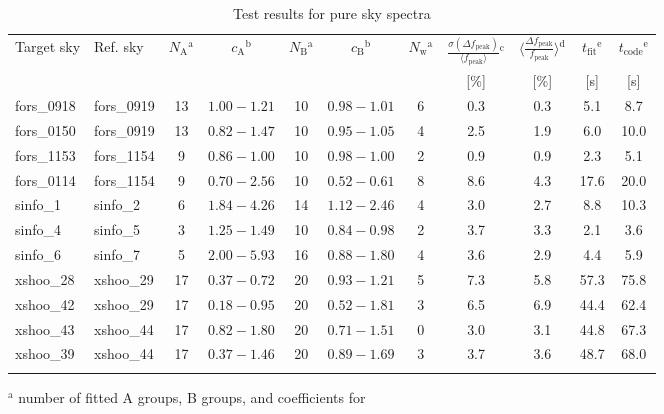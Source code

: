 \begin{table}
\caption[]{Test results for pure sky spectra}
\label{tab:results_sky}
\centering
\vspace{5pt}
\footnotesize
\begin{tabular}{l l c c c c c c c c c}
\hline\hline
\noalign{\smallskip}
Target sky & Ref. sky & $N_\mathrm{A}$$^\mathrm{a}$ & $c_\mathrm{A}$$^\mathrm{b}$ &
$N_\mathrm{B}$$^\mathrm{a}$ & $c_\mathrm{B}$$^\mathrm{b}$ & $N_\mathrm{w}$$^\mathrm{a}$ &
$\frac{\sigma(\Delta f_\mathrm{peak})}
{\langle f_\mathrm{peak} \rangle}$$^\mathrm{c}$ &
$\langle \frac{\Delta f_\mathrm{peak}}{f_\mathrm{peak}} \rangle$$^\mathrm{d}$ &
$t_\mathrm{fit}$$^\mathrm{e}$ & $t_\mathrm{code}$$^\mathrm{e}$ \\
& & & & & & & [\%] & [\%] & [s] & [s] \\
\noalign{\smallskip}
\hline
\noalign{\smallskip}
fors\_0918 & fors\_0919 & 13 & $1.00-1.21$ & 10 & $0.98-1.01$ & 6 &
0.3 & 0.3 & 5.1 & 8.7 \\
fors\_0150 & fors\_0919 & 13 & $0.82-1.47$ & 10 & $0.95-1.05$ & 4 &
2.5 & 1.9 & 6.0 & 10.0 \\
fors\_1153 & fors\_1154 & 9 & $0.86-1.00$ & 10 & $0.98-1.00$ & 2 &
0.9 & 0.9 & 2.3 & 5.1 \\
fors\_0114 & fors\_1154 & 9 & $0.70-2.56$ & 10 & $0.52-0.61$ & 8 &
8.6 & 4.3 & 17.6 & 20.0 \\
sinfo\_1 & sinfo\_2 & 6 & $1.84-4.26$ & 14 & $1.12-2.46$ & 4 &
3.0 & 2.7 & 8.8 & 10.3 \\
sinfo\_4 & sinfo\_5 & 3 & $1.25-1.49$ & 10 & $0.84-0.98$ & 2 &
3.7 & 3.3 & 2.1 & 3.6 \\
sinfo\_6 & sinfo\_7 & 5 & $2.00-5.93$ & 16 & $0.88-1.80$ & 4 &
3.6 & 2.9 & 4.4 & 5.9 \\
xshoo\_28 & xshoo\_29 & 17 & $0.37-0.72$ & 20 & $0.93-1.21$ & 5 &
7.3 & 5.8 & 57.3 & 75.8 \\
xshoo\_42 & xshoo\_29 & 17 & $0.18-0.95$ & 20 & $0.52-1.81$ & 3 &
6.5 & 6.9 & 44.4 & 62.4 \\
xshoo\_43 & xshoo\_44 & 17 & $0.82-1.80$ & 20 & $0.71-1.51$ & 0 &
3.0 & 3.1 & 44.8 & 67.3 \\
xshoo\_39 & xshoo\_44 & 17 & $0.37-1.46$ & 20 & $0.89-1.69$ & 3 &
3.7 & 3.6 & 48.7 & 68.0 \\
\noalign{\smallskip}
\hline
\end{tabular}
\footnotesize
\begin{list}{}{}
\item[$^\mathrm{a}$] number of fitted A groups, B groups, and coefficients for

\end{list}
\end{table}
